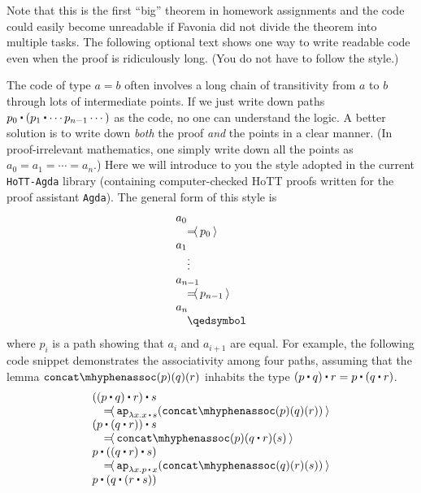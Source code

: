 \documentclass[12pt]{article}
\begin{document}
Note that this is the first ``big'' theorem
in homework assignments
and the code could easily become unreadable
if Favonia did not divide the theorem into multiple tasks.
The following optional text shows one way to write readable code
even when the proof is ridiculously long.
(You do not have to follow the style.)
\begin{mdframed}
The code of type $a = b$
often involves a long chain of transitivity from $a$ to $b$ through lots of intermediate points.
If we just write down paths $p_0 \concat (p_1 \concat \cdots p_{n-1} \cdots )$ as the code,
no one can understand the logic.
A better solution is to write down \emph{both} the proof \emph{and} the points
in a clear manner.
(In proof-irrelevant mathematics, one simply write down all the points as
$a_0 = a_1 = \cdots = a_n$.)
Here we will introduce to you the style adopted in the current \texttt{HoTT-Agda} library
(containing computer-checked HoTT proofs written for the proof assistant \texttt{Agda}).
The general form of this style is
\[
  \begin{array}{l}
    a_0
    \\
    \quad\reason{p_0}
    \\
    a_1
    \\
    \quad\vdots
    \\
    a_{n-1}
    \\
    \quad\reason{p_{n-1}}
    \\
    a_n
    \\
    \quad\qedsymbol
  \end{array}
\]
where $p_i$ is a path showing that $a_i$ and $a_{i+1}$ are equal.
For example, the following code snippet demonstrates the associativity among four paths,
assuming that the lemma $\concatassoc(p)(q)(r)$
inhabits the type $(p \concat q) \concat r = p \concat (q \concat r)$.
\[
  \begin{array}{l}
    ((p \concat q) \concat r) \concat s
    \\
    \quad\reason{\ap_{\lambda x.x\concat s}(\concatassoc(p)(q)(r))}
    \\
    (p \concat (q \concat r)) \concat s
    \\
    \quad\reason{\concatassoc(p)(q \concat r)(s)}
    \\
    p \concat ((q \concat r) \concat s)
    \\
    \quad\reason{\ap_{\lambda x.p\concat x}(\concatassoc(q)(r)(s))}
    \\
    p \concat (q \concat (r \concat s))
    \\

\end{array}\]
\end{mdframed}
\end{document}
